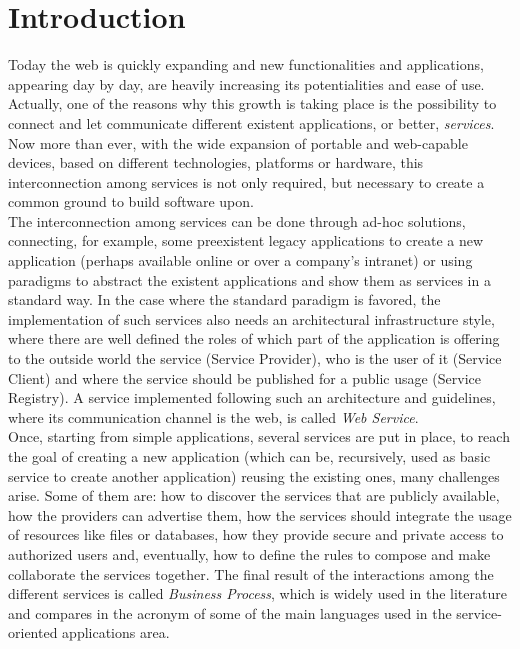 \section{Introduction}

Today the web is quickly expanding and new functionalities and applications, appearing day by day, are heavily increasing its potentialities and ease of use. Actually, one of the reasons why this growth is taking place is the possibility to connect and let communicate different existent applications, or better, \textit{services}. Now more than ever, with the wide expansion of portable and web-capable devices, based on different technologies, platforms or hardware, this interconnection among services is not only required, but necessary to create a common ground to build software upon.\\

The interconnection among services can be done through ad-hoc solutions, connecting, for example, some preexistent legacy applications to create a new application (perhaps available online or over a company's intranet) or using paradigms to abstract the existent applications and show them as services in a standard way. %
In the case where the standard paradigm is favored, the implementation of such services also needs an architectural infrastructure style, where there are well defined the roles of which part of the application is offering to the outside world the service (Service Provider), who is the user of it (Service Client) and where the service should be published for a public usage (Service Registry). %
A service implemented following such an architecture and guidelines, where its communication channel is the web, is called \textit{Web Service}.\\ %

Once, starting from simple applications, several services are put in place, to reach the goal of creating a new application (which can be, recursively, used as basic service to create another application) reusing the existing ones, many challenges arise. Some of them are: how to discover the services that are publicly available, how the providers can advertise them, how the services should integrate the usage of resources like files or databases, how they provide secure and private access to authorized users and, eventually, how to define the rules to compose and make collaborate the services together. 
The final result of the interactions among the different services is called \textit{Business Process}, which is widely used in the literature and compares in the acronym of some of the main languages used in the service-oriented applications area.\\

